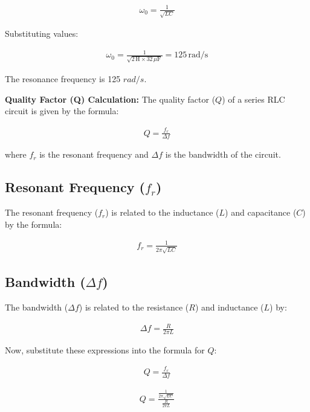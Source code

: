 \documentclass[journal,12pt,twocolumn]{IEEEtran}
\theoremstyle{remark}
\begin{document}
\begin{align}
\omega_0 = \frac{1}{\sqrt{LC}}
\end{align}

Substituting values:

\begin{align}
\omega_0 = \frac{1}{\sqrt{2 \, \text{H} \times 32 \, \mu\text{F}}} = 125 \, \text{rad/s}
\end{align}

The resonance frequency is 125 $rad/s$.

\textbf{Quality Factor (Q) Calculation:}
The quality factor (\(Q\)) of a series RLC circuit is given by the formula:

\begin{align}
 Q = \frac{f_r}{\Delta f} 
 \end{align}

where \(f_r\) is the resonant frequency and \(\Delta f\) is the bandwidth of the circuit.

\subsection*{Resonant Frequency (\(f_r\))}

The resonant frequency (\(f_r\)) is related to the inductance (\(L\)) and capacitance (\(C\)) by the formula:

\begin{align}
f_r = \frac{1}{2\pi\sqrt{LC}} 
\end{align}

\subsection*{Bandwidth (\(\Delta f\))}

The bandwidth (\(\Delta f\)) is related to the resistance (\(R\)) and inductance (\(L\)) by:

\begin{align}
\Delta f = \frac{R}{2\pi L} 
\end{align}

Now, substitute these expressions into the formula for \(Q\):

\begin{align}
 Q = \frac{f_r}{\Delta f}
 \end{align}


\begin{align}
 Q = \frac{\frac{1}{2\pi\sqrt{LC}}}{\frac{R}{2\pi L}} 
 \end{align}
\end{document}
